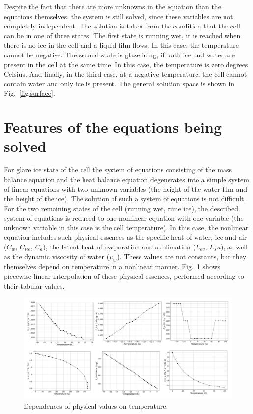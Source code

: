 \documentclass[
11pt,%
tightenlines,%
twoside,%
onecolumn,%
nofloats,%
nobibnotes,%
nofootinbib,%
superscriptaddress,%
noshowpacs,%
centertags]%
{revtex4}
\begin{document}
Despite the fact that there are more unknowns in the equation than the equations themselves, the system is still solved, since these variables are not completely independent.
The solution is taken from the condition that the cell can be in one of three states.
The first state is running wet, it is reached when there is no ice in the cell and a liquid film flows.
In this case, the temperature cannot be negative.
The second state is glaze icing, if both ice and water are present in the cell at the same time.
In this case, the temperature is zero degrees Celsius.
And finally, in the third case, at a negative temperature, the cell cannot contain water and only ice is present.
The general solution space is shown in Fig.~\ref{fig:surface}.

\section{Features of the equations being solved}

For glaze ice state of the cell the system of equations consisting of the mass balance equation and the heat balance equation degenerates into a simple system of linear equations with two unknown variables (the height of the water film and the height of the ice).
The solution of such a system of equations is not difficult.
For the two remaining states of the cell (running wet, rime ice), the described system of equations is reduced to one nonlinear equation with one variable (the unknown variable in this case is the cell temperature).
In this case, the nonlinear equation includes such physical essences as the specific heat of water, ice and air ($C_w$, $C_{ice}$, $C_a$), the latent heat of evaporation and sublimation ($L_{ev}$, $L_su$), as well as the dynamic viscosity of water ($\mu_w$).
These values are not constants, but they themselves depend on temperature in a nonlinear manner.
Fig.~\ref{fig:ph_graphics_h} shows piecewise-linear interpolation of these physical essences, performed according to their tabular values.

\begin{figure}[h]
\setcaptionmargin{5mm}
\onelinecaptionstrue
\includegraphics[width=1.0\textwidth]{pics/ph_graphics_h.pdf}
\caption{Dependences of physical values on temperature.}\label{fig:ph_graphics_h}
\end{figure}
\end{document}
